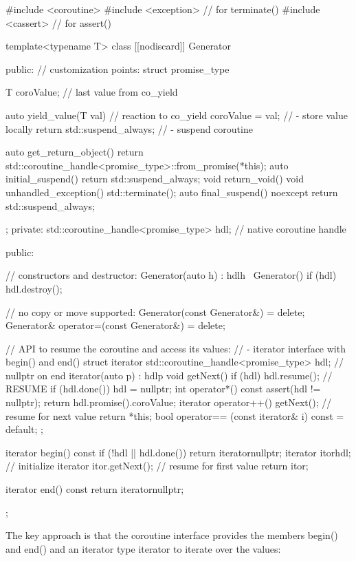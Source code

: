 \begin{cpp}
#include <coroutine>
#include <exception> // for terminate()
#include <cassert> // for assert()

template<typename T>
class [[nodiscard]] Generator {
	public:
	// customization points:
	struct promise_type {
		T coroValue{}; // last value from co_yield
		
		auto yield_value(T val) { // reaction to co_yield
			coroValue = val; // - store value locally
			return std::suspend_always{}; // - suspend coroutine
		}
		
		auto get_return_object() {
			return std::coroutine_handle<promise_type>::from_promise(*this);
		}
		auto initial_suspend() { return std::suspend_always{}; }
		void return_void() { }
		void unhandled_exception() { std::terminate(); }
		auto final_suspend() noexcept { return std::suspend_always{}; }
	};
private:
	std::coroutine_handle<promise_type> hdl; // native coroutine handle
	
public:
	
	// constructors and destructor:
	Generator(auto h) : hdl{h} { }
	~Generator() { if (hdl) hdl.destroy(); }
	
	// no copy or move supported:
	Generator(const Generator&) = delete;
	Generator& operator=(const Generator&) = delete;
	
	// API to resume the coroutine and access its values:
	// - iterator interface with begin() and end()
	struct iterator {
		std::coroutine_handle<promise_type> hdl; // nullptr on end
		iterator(auto p) : hdl{p} {
		}
		void getNext() {
			if (hdl) {
				hdl.resume(); // RESUME
				if (hdl.done()) {
					hdl = nullptr;
				}
			}
		}
		int operator*() const {
			assert(hdl != nullptr);
			return hdl.promise().coroValue;
		}
		iterator operator++() {
			getNext(); // resume for next value
			return *this;
		}
		bool operator== (const iterator& i) const = default;
	};
	
	iterator begin() const {
		if (!hdl || hdl.done()) {
			return iterator{nullptr};
		}
		iterator itor{hdl}; // initialize iterator
		itor.getNext(); // resume for first value
		return itor;
	}
	
	iterator end() const {
		return iterator{nullptr};
	}
};
\end{cpp}

The key approach is that the coroutine interface provides the members begin() and end() and an iterator type iterator to iterate over the values:

